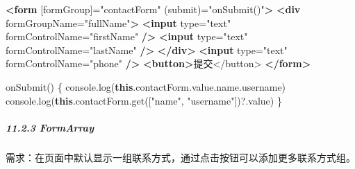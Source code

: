 \documentclass[
]{article}
\newenvironment{Shaded}{}{}
\newcommand{\AttributeTok}[1]{\textcolor[rgb]{0.49,0.56,0.16}{#1}}
\newcommand{\BuiltInTok}[1]{#1}
\newcommand{\FunctionTok}[1]{\textcolor[rgb]{0.02,0.16,0.49}{#1}}
\newcommand{\KeywordTok}[1]{\textcolor[rgb]{0.00,0.44,0.13}{\textbf{#1}}}
\newcommand{\NormalTok}[1]{#1}
\newcommand{\OperatorTok}[1]{\textcolor[rgb]{0.40,0.40,0.40}{#1}}
\newcommand{\OtherTok}[1]{\textcolor[rgb]{0.00,0.44,0.13}{#1}}
\newcommand{\StringTok}[1]{\textcolor[rgb]{0.25,0.44,0.63}{#1}}
\begin{document}
\begin{enumerate}
\begin{Shaded}
\begin{Highlighting}[]
\KeywordTok{\textless{}form}\OtherTok{ [formGroup]=}\StringTok{"contactForm"}\OtherTok{ (submit)=}\StringTok{"onSubmit()"}\KeywordTok{\textgreater{}}
  \KeywordTok{\textless{}div}\OtherTok{ formGroupName=}\StringTok{"fullName"}\KeywordTok{\textgreater{}}
    \KeywordTok{\textless{}input}\OtherTok{ type=}\StringTok{"text"}\OtherTok{ formControlName=}\StringTok{"firstName"} \KeywordTok{/\textgreater{}}
    \KeywordTok{\textless{}input}\OtherTok{ type=}\StringTok{"text"}\OtherTok{ formControlName=}\StringTok{"lastName"} \KeywordTok{/\textgreater{}}
  \KeywordTok{\textless{}/div\textgreater{}}
  \KeywordTok{\textless{}input}\OtherTok{ type=}\StringTok{"text"}\OtherTok{ formControlName=}\StringTok{"phone"} \KeywordTok{/\textgreater{}}
  \KeywordTok{\textless{}button\textgreater{}}\NormalTok{提交\textless{}/button\textgreater{}}
\KeywordTok{\textless{}/form\textgreater{}}
\end{Highlighting}
\end{Shaded}

\begin{Shaded}
\begin{Highlighting}[]
\FunctionTok{onSubmit}\NormalTok{() \{}
  \BuiltInTok{console}\OperatorTok{.}\FunctionTok{log}\NormalTok{(}\KeywordTok{this}\OperatorTok{.}\AttributeTok{contactForm}\OperatorTok{.}\AttributeTok{value}\OperatorTok{.}\AttributeTok{name}\OperatorTok{.}\AttributeTok{username}\NormalTok{)}
  \BuiltInTok{console}\OperatorTok{.}\FunctionTok{log}\NormalTok{(}\KeywordTok{this}\OperatorTok{.}\AttributeTok{contactForm}\OperatorTok{.}\FunctionTok{get}\NormalTok{([}\StringTok{"name"}\OperatorTok{,} \StringTok{"username"}\NormalTok{])}\OperatorTok{?.}\AttributeTok{value}\NormalTok{)}
\NormalTok{\}}
\end{Highlighting}
\end{Shaded}
\end{enumerate}

\hypertarget{1123-formarray}{%
\subparagraph{11.2.3 FormArray}\label{1123-formarray}}

需求：在页面中默认显示一组联系方式，通过点击按钮可以添加更多联系方式组。
\end{document}
